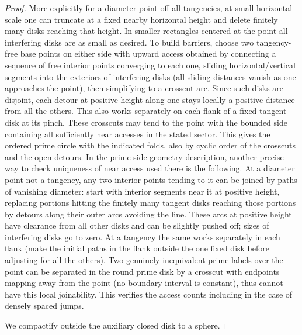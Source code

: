 \begin{proof}
More explicitly for a diameter point off all tangencies, at small horizontal scale one can truncate at a fixed nearby horizontal height and delete finitely many disks reaching that height.
In smaller rectangles centered at the point all interfering disks are as small as desired.
To build barriers, choose two tangency-free base points on either side with upward access obtained by connecting a sequence of free interior points converging to each one, sliding horizontal/vertical segments into the exteriors of interfering disks (all sliding distances vanish as one approaches the point), then simplifying to a crosscut arc.
Since such disks are disjoint, each detour at positive height along one stays locally a positive distance from all the others.
This also works separately on each flank of a fixed tangent disk at its pinch.
These crosscuts may tend to the point with the bounded side containing all sufficiently near accesses in the stated sector.
This gives the ordered prime circle with the indicated folds, also by cyclic order of the crosscuts and the open detours.
In the prime-side geometry description, another precise way to check uniqueness of near access used there is the following.
At a diameter point not a tangency, any two interior points tending to it can be joined by paths of vanishing diameter: start with interior segments near it at positive height, replacing portions hitting the finitely many tangent disks reaching those portions by detours along their outer arcs avoiding the line.
These arcs at positive height have clearance from all other disks and can be slightly pushed off; sizes of interfering disks go to zero.
At a tangency the same works separately in each flank (make the initial paths in the flank outside the one fixed disk before adjusting for all the others).
Two genuinely inequivalent prime labels over the point can be separated in the round prime disk by a crosscut with endpoints mapping away from the point (no boundary interval is constant), thus cannot have this local joinability.
This verifies the access counts including in the case of densely spaced jumps.

We compactify outside the auxiliary closed disk to a sphere.


\end{proof}
